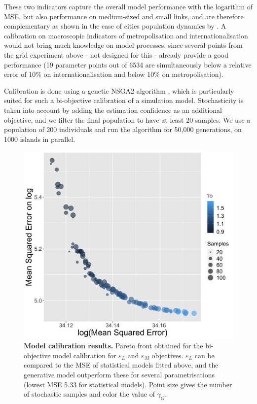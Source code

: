 \documentclass[10pt,letterpaper]{article}
\begin{document}
These two indicators capture the overall model performance with the logarithm of MSE, but also performance on medium-sized and small links, and are therefore complementary as shown in the case of cities population dynamics by \cite{raimbault2018indirect}. A calibration on macroscopic indicators of metropolisation and internationalisation would not bring much knowledge on model processes, since several points from the grid experiment above - not designed for this - already provide a good performance (19 parameter points out of 6534 are simultaneously below a relative error of 10\% on internationalisation and below 10\% on metropolisation).

Calibration is done using a genetic NSGA2 algorithm \cite{deb2002fast}, which is particularly suited for such a bi-objective calibration of a simulation model. Stochasticity is taken into account by adding the estimation confidence as an additional objective, and we filter the final population to have at least 20 samples. We use a population of 200 individuals and run the algorithm for 50,000 generations, on 1000 islands in parallel.


\begin{figure}
	\begin{center}
    \includegraphics[width=0.75\linewidth]{figures/Fig8.png}
    \end{center}
	\caption{\textbf{Model calibration results.} Pareto front obtained for the bi-objective model calibration for $\varepsilon_L$ and $\varepsilon_M$ objectives. $\varepsilon_L$ can be compared to the MSE of statistical models fitted above, and the generative model outperform these for several parametrisations (lowest MSE 5.33 for statistical models). Point size gives the number of stochastic samples and color the value of $\gamma_O$.\label{fig:fig8}}
\end{figure}
\end{document}
